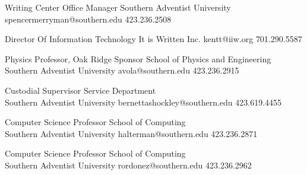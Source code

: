 

{Writing Center Office Manager}
{Southern Adventist University}
{spencermerryman@southern.edu}
{423.236.2508}

{Director Of Information Technology}
{It is Written Inc.}
{kentt@iiw.org}
{701.290.5587}

{Physics Professor, Oak Ridge Sponsor}
{School of Physics and Engineering\\Southern Adventist University}
{avola@southern.edu}
{423.236.2915}

{Custodial Supervisor}
{Service Department\\Southern Adventist University}
{bernettashockley@southern.edu}
{423.619.4455}

{Computer Science Professor}
{School of Computing\\Southern Adventist University}
{halterman@southern.edu}
{423.236.2871}

{Computer Science Professor}
{School of Computing\\Southern Adventist University}
{rordonez@southern.edu}
{423.236.2962}

